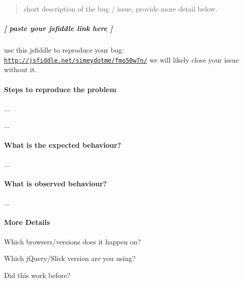 \begin{quote}
short description of the bug / issue, provide more detail below. \end{quote}




\subparagraph*{{\ttfamily \mbox{[} paste your jsfiddle link here \mbox{]}}}

use this jsfiddle to reproduce your bug\+: \href{http://jsfiddle.net/simeydotme/fmo50w7n/}{\tt http\+://jsfiddle.\+net/simeydotme/fmo50w7n/} we will likely close your issue without it.





\paragraph*{Steps to reproduce the problem}


\begin{DoxyEnumerate}
\item ...
\item ...
\end{DoxyEnumerate}





\paragraph*{What is the expected behaviour?}

...





\paragraph*{What is observed behaviour?}

...





\paragraph*{More Details}


\begin{DoxyItemize}
\item Which browsers/versions does it happen on?
\item Which j\+Query/\+Slick version are you using?
\item Did this work before? 
\end{DoxyItemize}